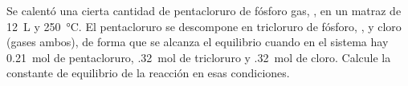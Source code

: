 Se calentó una cierta cantidad de pentacloruro de fósforo gas, , en un matraz de \SI{12}{\liter} y \SI{250}{\celsius}. El pentacloruro se descompone en tricloruro de fósforo, , y cloro (gases ambos), de forma que se alcanza el equilibrio cuando en el sistema hay \SI{0,21}{\mol} de pentacloruro, \SI{,32}{\mol} de tricloruro y \SI{,32}{\mol} de cloro. Calcule la constante de equilibrio de la reacción en esas condiciones.
